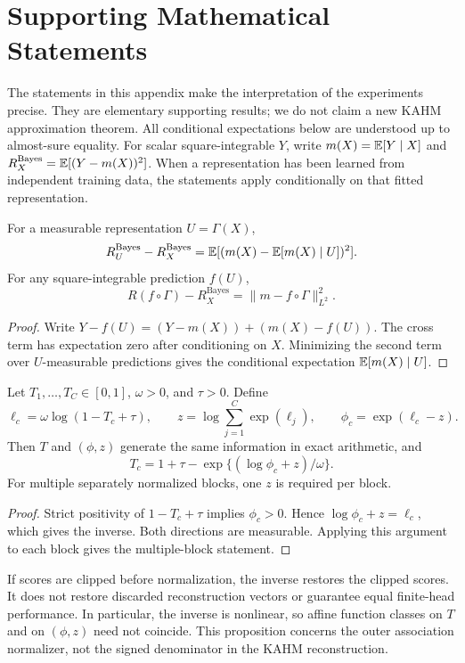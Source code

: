 \section{Supporting Mathematical Statements}\label{app:theory}

The statements in this appendix make the interpretation of the experiments
precise. They are elementary supporting results; we do not claim a new
KAHM approximation theorem. All conditional expectations below are understood
up to almost-sure equality. For scalar square-integrable $Y$, write
$m(X)=\mathbb{E}[Y\mid X]$ and
$R_X^{\mathrm{Bayes}}=\mathbb{E}[(Y-m(X))^2]$.
When a representation has been learned from independent training data,
the statements apply conditionally on that fitted representation.

\begin{proposition}
\label{prop:representation-risk}
For a measurable representation $U=\Gamma(X)$,
\[
 R_U^{\mathrm{Bayes}}-R_X^{\mathrm{Bayes}}
 =\mathbb{E}[(m(X)-\mathbb{E}[m(X)\mid U])^2].
\]
For any square-integrable prediction $f(U)$,
\[
 R(f\circ\Gamma)-R_X^{\mathrm{Bayes}}
 =\|m-f\circ\Gamma\|_{L^2}^2.
\]
\end{proposition}
\begin{proof}
Write $Y-f(U)=(Y-m(X))+(m(X)-f(U))$.
The cross term has expectation zero after conditioning on $X$.
Minimizing the second term over $U$-measurable predictions gives the
conditional expectation $\mathbb{E}[m(X)\mid U]$.
\end{proof}

\begin{proposition}
\label{prop:normalizer-inverse}
Let $T_1,\ldots,T_C\in[0,1]$, $\omega>0$, and $\tau>0$. Define
\[
 \ell_c=\omega\log(1-T_c+\tau),\qquad
 z=\log\sum_{j=1}^{C}\exp(\ell_j),\qquad
 \phi_c=\exp(\ell_c-z).
\]
Then $T$ and $(\phi,z)$ generate the same information in exact arithmetic,
and
\[
 T_c=1+\tau-\exp\{(\log\phi_c+z)/\omega\}.
\]
For multiple separately normalized blocks, one $z$ is required per block.
\end{proposition}
\begin{proof}
Strict positivity of $1-T_c+\tau$ implies $\phi_c>0$.
Hence $\log\phi_c+z=\ell_c$, which gives the inverse.
Both directions are measurable. Applying this argument to each block
gives the multiple-block statement.
\end{proof}

If scores are clipped before normalization, the inverse restores the
clipped scores. It does not restore discarded reconstruction vectors or
guarantee equal finite-head performance. In particular, the inverse is
nonlinear, so affine function classes on $T$ and on $(\phi,z)$ need not
coincide. This proposition concerns the outer association normalizer,
not the signed denominator in the KAHM reconstruction.

